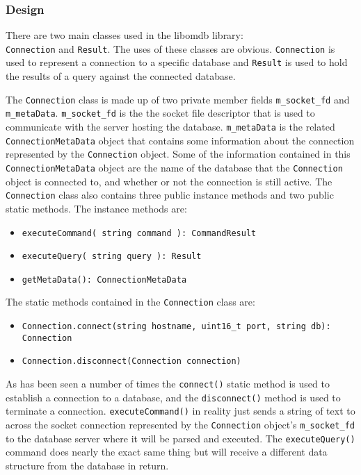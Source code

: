 \documentclass[letterpaper, 12pt]{article}
\begin{document}
  \par\vspace{\baselineskip}

  \subsubsection{Design}
  There are two main classes used in the libomdb library:  \\
  \lstinline|Connection| and \lstinline|Result|. The uses of these classes
  are obvious. \lstinline|Connection| is used to represent a connection to
  a specific database and \lstinline|Result| is used to hold the results of a
  query against the connected database.

  \par\vspace{\baselineskip}
  The \lstinline|Connection| class is made up of two private
  member fields \lstinline|m_socket_fd| and
  \lstinline|m_metaData|.
  \lstinline|m_socket_fd| is the the socket file descriptor that is
  used to communicate with the server hosting the database.
  \lstinline|m_metaData| is the related
  \lstinline|ConnectionMetaData| object that contains some
  information about the connection represented by the
  \lstinline|Connection| object. Some of the information contained
  in this \lstinline|ConnectionMetaData| object are
  the name of the database that the \lstinline|Connection| object
  is connected to, and whether or not the connection is still active. The
  \lstinline|Connection| class also contains three public
  instance methods and two public static methods. The instance methods are:
  \begin{itemize}
    \item \lstinline|executeCommand( string command ): CommandResult|
    \item \lstinline|executeQuery( string query ): Result|
    \item \lstinline|getMetaData(): ConnectionMetaData|
  \end{itemize}
  The static methods contained in the \lstinline|Connection| class
  are:
  \begin{itemize}
  	\item \lstinline|Connection.connect(string hostname, uint16_t port, string db): Connection|
  	\item \lstinline|Connection.disconnect(Connection connection)|
  \end{itemize}
  As has been seen a number of times the \lstinline|connect()|
  static method is used  to establish a connection to a database, and the
  \lstinline|disconnect()| method is used to terminate a connection.
  \lstinline|executeCommand()| in reality just sends a string of
  text to across the socket connection represented by the
  \lstinline|Connection| object's
  \lstinline|m_socket_fd| to the database server where it will be
  parsed and executed. The \lstinline|executeQuery()| command
  does nearly the exact same thing but will receive a different data structure from the
  database in return.
\end{document}

